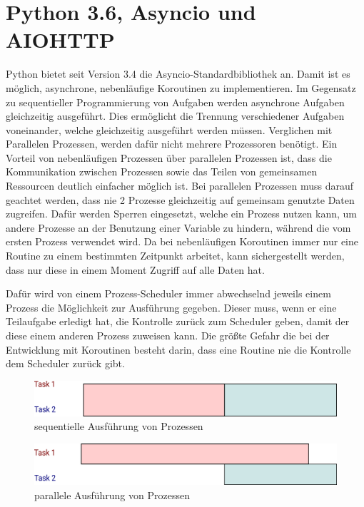 \documentclass[12pt,a4paper,hidelinks]{scrreprt}
\begin{document}
	
\section{Python 3.6, Asyncio und AIOHTTP}\label{sec:py36}
	Python bietet seit Version 3.4 die Asyncio-Standardbibliothek  an. Damit ist es möglich, asynchrone, nebenläufige Koroutinen zu implementieren. Im Gegensatz zu sequentieller Programmierung von Aufgaben werden asynchrone Aufgaben gleichzeitig ausgeführt. Dies ermöglicht die Trennung verschiedener Aufgaben voneinander, welche gleichzeitig ausgeführt werden müssen. Verglichen mit Parallelen Prozessen, werden dafür nicht mehrere Prozessoren benötigt.  
	Ein Vorteil von nebenläufigen Prozessen über parallelen Prozessen ist, dass die Kommunikation zwischen Prozessen sowie das Teilen von gemeinsamen Ressourcen deutlich einfacher möglich ist. Bei parallelen Prozessen muss darauf geachtet werden, dass nie 2 Prozesse gleichzeitig auf gemeinsam genutzte Daten zugreifen. Dafür werden Sperren eingesetzt, welche ein Prozess nutzen kann, um andere Prozesse an der Benutzung einer Variable zu hindern, während die vom ersten Prozess verwendet wird. Da bei nebenläufigen Koroutinen immer nur eine Routine zu einem bestimmten Zeitpunkt arbeitet, kann sichergestellt werden, dass nur diese in einem Moment Zugriff auf alle Daten hat. 
	
	Dafür wird von einem Prozess-Scheduler immer abwechselnd jeweils einem Prozess die Möglichkeit zur Ausführung gegeben. Dieser muss, wenn er eine Teilaufgabe erledigt hat, die Kontrolle zurück zum Scheduler geben, damit der diese einem anderen Prozess zuweisen kann. Die größte Gefahr die bei der Entwicklung mit Koroutinen besteht darin, dass eine Routine nie die Kontrolle dem Scheduler zurück gibt.
	
	
	\begin{figure}[h]
		\centering
		\includegraphics[width=0.7\linewidth]{./img/sequenziell.png}
		\caption{sequentielle Ausführung von Prozessen}
		\label{fig:sequenziell}
	\end{figure}
	
	\begin{figure}[h]
		\centering
		\includegraphics[width=0.7\linewidth]{./img/parallel.png}
		\caption{parallele Ausführung von Prozessen}
		\label{fig:parallel}
	\end{figure}
			
\end{document}
